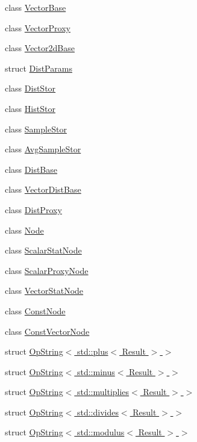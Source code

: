 \begin{DoxyCompactItemize}
\item 
class \hyperlink{classStats_1_1VectorBase}{VectorBase}
\item 
class \hyperlink{classStats_1_1VectorProxy}{VectorProxy}
\item 
class \hyperlink{classStats_1_1Vector2dBase}{Vector2dBase}
\item 
struct \hyperlink{structStats_1_1DistParams}{DistParams}
\item 
class \hyperlink{classStats_1_1DistStor}{DistStor}
\item 
class \hyperlink{classStats_1_1HistStor}{HistStor}
\item 
class \hyperlink{classStats_1_1SampleStor}{SampleStor}
\item 
class \hyperlink{classStats_1_1AvgSampleStor}{AvgSampleStor}
\item 
class \hyperlink{classStats_1_1DistBase}{DistBase}
\item 
class \hyperlink{classStats_1_1VectorDistBase}{VectorDistBase}
\item 
class \hyperlink{classStats_1_1DistProxy}{DistProxy}
\item 
class \hyperlink{classStats_1_1Node}{Node}
\item 
class \hyperlink{classStats_1_1ScalarStatNode}{ScalarStatNode}
\item 
class \hyperlink{classStats_1_1ScalarProxyNode}{ScalarProxyNode}
\item 
class \hyperlink{classStats_1_1VectorStatNode}{VectorStatNode}
\item 
class \hyperlink{classStats_1_1ConstNode}{ConstNode}
\item 
class \hyperlink{classStats_1_1ConstVectorNode}{ConstVectorNode}
\item 
struct \hyperlink{structStats_1_1OpString_3_01std_1_1plus_3_01Result_01_4_01_4}{OpString$<$ std::plus$<$ Result $>$ $>$}
\item 
struct \hyperlink{structStats_1_1OpString_3_01std_1_1minus_3_01Result_01_4_01_4}{OpString$<$ std::minus$<$ Result $>$ $>$}
\item 
struct \hyperlink{structStats_1_1OpString_3_01std_1_1multiplies_3_01Result_01_4_01_4}{OpString$<$ std::multiplies$<$ Result $>$ $>$}
\item 
struct \hyperlink{structStats_1_1OpString_3_01std_1_1divides_3_01Result_01_4_01_4}{OpString$<$ std::divides$<$ Result $>$ $>$}
\item 
struct \hyperlink{structStats_1_1OpString_3_01std_1_1modulus_3_01Result_01_4_01_4}{OpString$<$ std::modulus$<$ Result $>$ $>$}

\end{DoxyCompactItemize}
